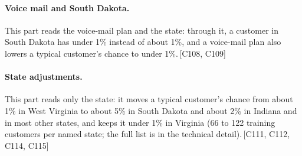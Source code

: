 \documentclass[a4paper,10pt]{article}
\newif\ifreviewmarks
\newcommand{\reviewrule}{\noindent{\color{BrickRed}\rule{\linewidth}{0.8pt}}}
\newenvironment{drafted}[1][]{%
  \ifreviewmarks\par\addvspace{\medskipamount}\reviewrule\par\nopagebreak
  \noindent{\color{BrickRed}\sffamily\footnotesize\textbf{Thesis Draft}\quad #1\hfill review}\par\nopagebreak\smallskip\fi}{%
  \ifreviewmarks\par\smallskip\noindent{\color{BrickRed}\sffamily\footnotesize end of thesis draft}\par\nopagebreak\reviewrule\par\medskip\fi}
\begin{document}
\begin{drafted}[plain-language layer: churn100-s7-c1]
\paragraph{Voice mail and South Dakota.} This part reads the voice-mail plan and the state: through it, a customer in South Dakota has under 1\% instead of about 1\%, and a voice-mail plan also lowers a typical customer's chance to under 1\%.\,{\scriptsize\textcolor{NavyBlue}{[C108, C109]}}
\paragraph{State adjustments.} This part reads only the state: it moves a typical customer's chance from about 1\% in West Virginia to about 5\% in South Dakota and about 2\% in Indiana and in most other states, and keeps it under 1\% in Virginia (66 to 122 training customers per named state; the full list is in the technical detail).\,{\scriptsize\textcolor{NavyBlue}{[C111, C112, C114, C115]}}

\end{drafted}
\end{document}
